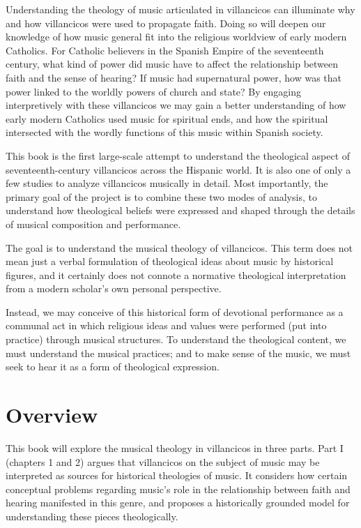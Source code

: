 \documentclass{memoir}
\begin{document}
{{{    Understanding the theology of music articulated in villancicos can illuminate why and how villancicos were used to propagate faith.
    Doing so will deepen our knowledge of how music general fit into the religious worldview of early modern Catholics.
    For Catholic believers in the Spanish Empire of the seventeenth century, what kind of power did music have to affect the relationship between faith and the sense of hearing?
    If music had supernatural power, how was that power linked to the worldly powers of church and state?
    By engaging interpretively with these villancicos we may gain a better understanding of how early modern Catholics used music for spiritual ends, and how the spiritual intersected with the wordly functions of this music within Spanish society.
  
    This book is the first large-scale attempt to understand the theological aspect of seventeenth-century villancicos across the Hispanic world.
    It is also one of only a few studies to analyze villancicos musically in detail.
    Most importantly, the primary goal of the project is to combine these two modes of analysis, to understand how theological beliefs were expressed and shaped through the details of musical composition and performance.
  
    The goal is to understand the musical theology of villancicos.
    This term does not mean just a verbal formulation of theological ideas about music by historical figures, and it certainly does not connote a normative theological interpretation from a modern scholar’s own personal perspective.
    
    Instead, we may conceive of this historical form of devotional performance as a communal act in which religious ideas and values were performed (put into practice) through musical structures.
    To understand the theological content, we must understand the musical practices; and to make sense of the music, we must seek to hear it as a form of theological expression.
  
    \section{Overview}
    \label{}
    
      This book will explore the musical theology in villancicos in three parts.
      Part I (chapters 1 and 2) argues that villancicos on the subject of music may be interpreted as sources for historical theologies of music.
      It considers how certain conceptual problems regarding music’s role in the relationship between faith and hearing manifested in this genre, and proposes a historically grounded model for understanding these pieces theologically.
    
}}}
\end{document}
